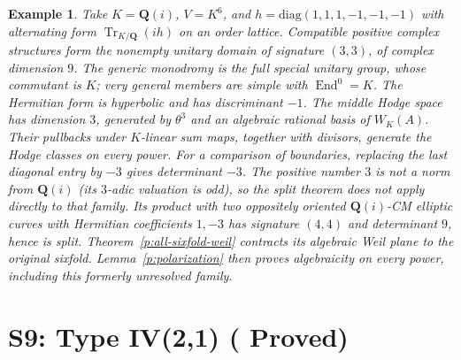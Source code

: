 \documentclass[10pt,reqno]{article}
\theoremstyle{emphasizedplain}
\DeclareRobustCommand{\provedstatus}{%
  \texorpdfstring{\textcolor{ProvedGreen}{\textbf{Proved}}}{Proved}}
\theoremstyle{emphasizeddefinition}
\newtheorem{example}[theorem]{Example}
\theoremstyle{emphasizeddefinition}
\DeclareMathOperator{\End}{End}
\DeclareMathOperator{\Tr}{Tr}
\newcommand{\Q}{\mathbf Q}
\begin{document}
\begin{example}
Take $K=\Q(i)$, $V=K^6$, and
$h=\mathrm{diag}(1,1,1,-1,-1,-1)$ with alternating form
$\Tr_{K/\Q}(i h)$ on an order lattice. Compatible positive complex
structures form the nonempty unitary domain of signature $(3,3)$, of
complex dimension $9$. The generic monodromy is the full special unitary
group, whose commutant is $K$; very general members are simple with
$\End^0=K$. The Hermitian form is hyperbolic and has discriminant $-1$.
The middle Hodge space has dimension $3$, generated by $\theta^3$ and an
algebraic rational basis of $W_K(A)$. Their pullbacks under $K$-linear sum
maps, together with divisors, generate the Hodge classes on every power.
For a comparison of boundaries, replacing the last diagonal entry by
$-3$ gives determinant $-3$. The positive number $3$ is not a norm from
$\Q(i)$ (its $3$-adic valuation is odd), so the split theorem does not
apply directly to that family. Its product with two oppositely oriented
$\Q(i)$-CM elliptic curves with Hermitian coefficients $1,-3$
has signature $(4,4)$ and determinant $9$, hence is split.
Theorem~\ref{p:all-sixfold-weil} contracts its algebraic Weil plane
to the original sixfold. Lemma~\ref{p:polarization} then proves
algebraicity on every power, including this formerly unresolved family.
\end{example}
\section{S9: Type IV(2,1) (\provedstatus)}\label{sec:S9}
\end{document}
